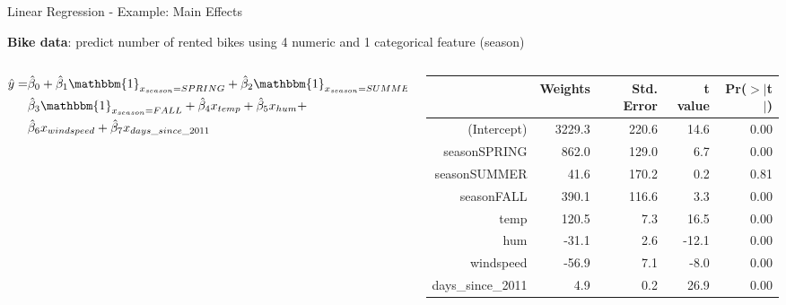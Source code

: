 \documentclass[11pt,compress,t,notes=noshow, aspectratio=169, xcolor=table]{beamer}
\begin{document}
\begin{frame}{Linear Regression - Example: Main Effects}

\textbf{Bike data}: predict number of rented bikes using 4 numeric and 1 categorical feature (season)
\begin{columns}[T, totalwidth=\linewidth]
\begin{column}{0.52\textwidth}
\begin{align*}
\hat y = 
& \hat \beta_0 + 
\hat \beta_1 \mathbbm{1}_{x_{season} = SPRING} +
\hat \beta_2 \mathbbm{1}_{x_{season} = SUMMER} +\\
& 
\hat \beta_3 \mathbbm{1}_{x_{season} = FALL} + 
\hat \beta_4 x_{temp} + 
\hat \beta_5 x_{hum} + \\
& 
\hat \beta_6 x_{windspeed} + 
\hat \beta_7 x_{days\_since\_2011}
\end{align*}
\end{column}
\begin{column}{0.47\textwidth}
  \centering
\begin{tiny}
\begin{table}[ht]
\begin{tabular}{rrrrr}
  \hline
 & Weights & Std. Error & t value & Pr($>$$|$t$|$) \\

  \hline
(Intercept) & 3229.3 & 220.6 & 14.6 & 0.00 \\ 
  seasonSPRING & 862.0 & 129.0 & 6.7 & 0.00 \\ 
  seasonSUMMER & 41.6 & 170.2 & 0.2 & 0.81 \\ 
  seasonFALL & 390.1 & 116.6 & 3.3 & 0.00 \\ 
  temp & 120.5 & 7.3 & 16.5 & 0.00 \\ 
  hum & -31.1 & 2.6 & -12.1 & 0.00 \\ 
  windspeed & -56.9 & 7.1 & -8.0 & 0.00 \\ 
  days\_since\_2011 & 4.9 & 0.2 & 26.9 & 0.00 \\
   \hline
\end{tabular}
\end{table}
\end{tiny}
\end{column}
\end{columns}
\pause


\end{frame}
\end{document}

